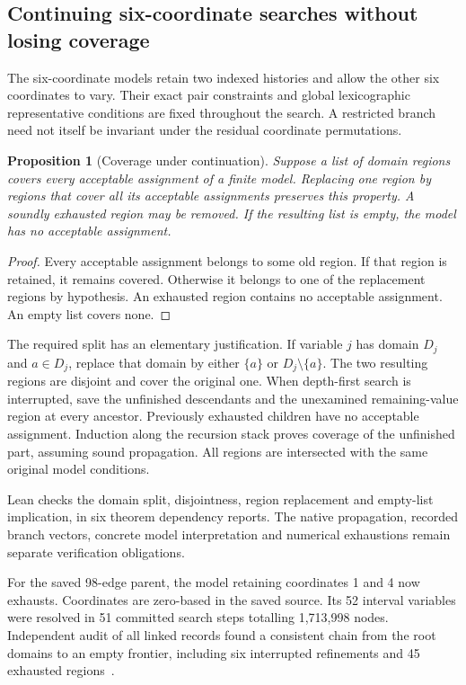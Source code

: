 \documentclass[11pt,a4paper]{article}
\newtheorem{proposition}[theorem]{Proposition}
\theoremstyle{definition}
\theoremstyle{remark}
\begin{document}
\subsection{Continuing six-coordinate searches without losing coverage}
\label{sec:history208}
The six-coordinate models retain two indexed histories and allow the
other six coordinates to vary. Their exact pair constraints and global
lexicographic representative conditions are fixed throughout the search.
A restricted branch need not itself be invariant under the residual
coordinate permutations.

\begin{proposition}[Coverage under continuation]
Suppose a list of domain regions covers every acceptable assignment of
a finite model. Replacing one region by regions that cover all its
acceptable assignments preserves this property. A soundly exhausted
region may be removed. If the resulting list is empty, the model has
no acceptable assignment.
\end{proposition}
\begin{proof}
Every acceptable assignment belongs to some old region. If that region
is retained, it remains covered. Otherwise it belongs to one of the
replacement regions by hypothesis. An exhausted region contains no
acceptable assignment. An empty list covers none.
\end{proof}

The required split has an elementary justification. If variable $j$
has domain $D_j$ and $a\in D_j$, replace that domain by either
$\{a\}$ or $D_j\setminus\{a\}$. The two resulting regions are
disjoint and cover the original one. When depth-first search is
interrupted, save the unfinished descendants and the unexamined
remaining-value region at every ancestor. Previously exhausted
children have no acceptable assignment. Induction along the recursion
stack proves coverage of the unfinished part, assuming sound propagation.
All regions are intersected with the same original model conditions.

Lean checks the domain split, disjointness, region replacement and
empty-list implication, in six theorem dependency reports. The native
propagation, recorded branch vectors, concrete model interpretation and
numerical exhaustions remain separate verification obligations.

For the saved 98-edge parent, the model retaining coordinates 1 and 4
now exhausts. Coordinates are zero-based in the saved source. Its 52
interval variables were resolved in 51 committed search steps totalling
1,713,998 nodes. Independent audit of all linked records found a
consistent chain from the root domains to an empty frontier, including
six interrupted refinements and 45 exhausted regions~\cite{research208}.
\end{document}
